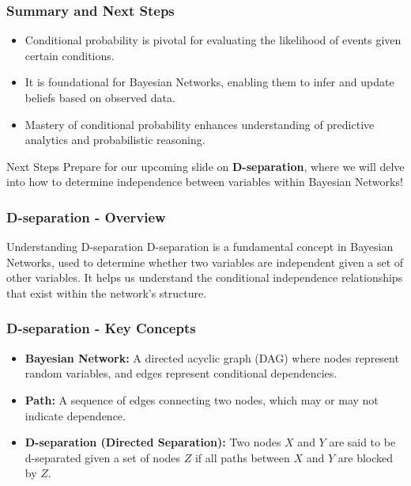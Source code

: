 \documentclass[aspectratio=169]{beamer}
\begin{document}
\begin{frame}[fragile]
  \frametitle{Summary and Next Steps}
  \begin{itemize}
    \item Conditional probability is pivotal for evaluating the likelihood of events given certain conditions.
    \item It is foundational for Bayesian Networks, enabling them to infer and update beliefs based on observed data.
    \item Mastery of conditional probability enhances understanding of predictive analytics and probabilistic reasoning.
  \end{itemize}

  \begin{block}{Next Steps}
    Prepare for our upcoming slide on \textbf{D-separation}, where we will delve into how to determine independence between variables within Bayesian Networks!
  \end{block}
\end{frame}

\begin{frame}[fragile]
    \frametitle{D-separation - Overview}
    \begin{block}{Understanding D-separation}
        D-separation is a fundamental concept in Bayesian Networks, 
        used to determine whether two variables are independent given a 
        set of other variables. It helps us understand the conditional 
        independence relationships that exist within the network’s structure.
    \end{block}
\end{frame}

\begin{frame}[fragile]
    \frametitle{D-separation - Key Concepts}
    \begin{itemize}
        \item \textbf{Bayesian Network:} A directed acyclic graph (DAG) where 
        nodes represent random variables, and edges represent conditional dependencies.
        
        \item \textbf{Path:} A sequence of edges connecting two nodes, which may 
        or may not indicate dependence.
        
        \item \textbf{D-separation (Directed Separation):} Two nodes $X$ and $Y$ 
        are said to be d-separated given a set of nodes $Z$ if all paths 
        between $X$ and $Y$ are blocked by $Z$.
    \end{itemize}
\end{frame}
\end{document}
